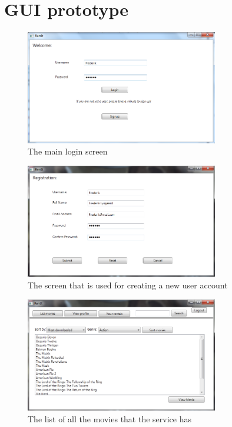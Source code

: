 \section{GUI prototype}
\label{Appendix_GUI_Prototype}

\begin{figure}[!ht]
  \centering
    \includegraphics[width=0.75\textwidth]{Parts/Appendix/Images/Login}
  \caption{The main login screen}
  \label{fig:Appendix_GUI_PrototypeLogin}
\end{figure}

\begin{figure}[!ht]
  \centering
    \includegraphics[width=0.75\textwidth]{Parts/Appendix/Images/Signup}
  \caption{The screen that is used for creating a new user account}
  \label{fig:Appendix_GUI_PrototypeSignup}
\end{figure}
\clearpage


\begin{figure}[!ht]
  \centering
    \includegraphics[width=0.75\textwidth]{Parts/Appendix/Images/Listmovies}
  \caption{The list of all the movies that the service has}
  \label{fig:Appendix_GUI_PrototypeAllmovies}
\end{figure}

